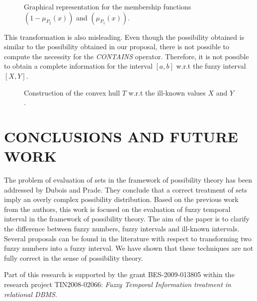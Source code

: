\documentclass[twoside,twocolumn,a4paper]{article}
\begin{document}
\begin{figure}[h!]
  \centering
  
  \caption{Graphical representation for the membership functions $\left(1-\mu_{P_2}(x)\right)$ and $\left( \mu_{P_1}(x) \right) $.}
  \label{fig:example_ch}
\end{figure}

This transformation is also misleading. Even though the possibility obtained is similar to the possibility obtained in our proposal, there is not possible to compute the necessity for the \emph{CONTAINS} operator. Therefore, it is not possible to obtain a complete information for the interval $[a,b]$ w.r.t the fuzzy interval $[X,Y]$.

\begin{figure}[h!]
  \centering
 
  \caption{Construction of the convex hull $T$ w.r.t the ill-known values $X$ and $Y$.}
  \label{fig:convex-hull-T}
\end{figure}







\section{\label{sec:conclusions}CONCLUSIONS AND FUTURE WORK}
The problem of evaluation of sets in the framework of possibility theory has been addressed by Dubois and Prade. They conclude that a correct treatment of sets imply an overly complex possibility distribution. Based on the previous work from the authors, this work is focused on the evaluation of fuzzy temporal interval in the framework of possibility theory. The aim of the paper is to clarify the difference between fuzzy numbers, fuzzy intervals and ill-known intervals. Several proposals can be found in the literature with respect to transforming two fuzzy numbers into a fuzzy interval. We have shown that these techniques are not fully correct in the sense of possibility theory.\\



\begin{ack}
Part of this research is supported by the grant BES-2009-013805 within the research project TIN2008-02066: \emph{Fuzzy Temporal Information treatment in relational DBMS}.
\end{ack}



\end{document}
